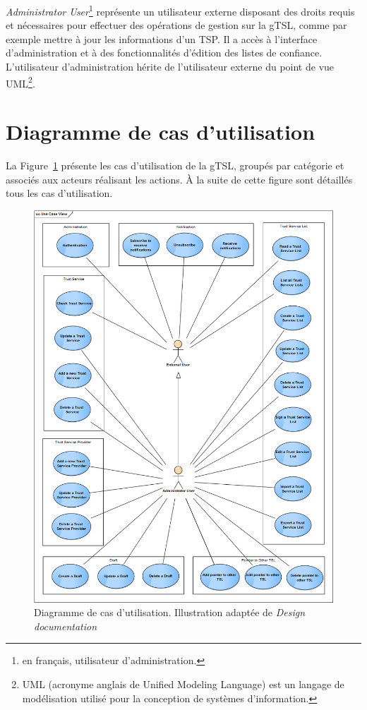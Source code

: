 \documentclass{tnreport}
\begin{document}
\textit{Administrator User}\footnote{en français, utilisateur d'administration.} représente un utilisateur externe disposant des droits requis et nécessaires pour effectuer des opérations de gestion sur la gTSL, comme par exemple mettre à jour les informations d'un TSP. Il a accès à l'interface d'administration et à des fonctionnalités d'édition des listes de confiance. L'utilisateur d'administration hérite de l'utilisateur externe du point de vue UML\footnote{UML (acronyme anglais de Unified Modeling Language) est un langage de modélisation utilisé pour la conception de systèmes d'information.}.

\section{Diagramme de cas d'utilisation}

La Figure~\ref{fig:use-case-diagram} présente les cas d'utilisation de la gTSL, groupés par catégorie et associés aux acteurs réalisant les actions. À la suite de cette figure sont détaillés tous les cas d'utilisation.

\begin{figure}[h]
	\centering
	\includegraphics[scale=0.53]{figures/use-case-diagram}
	\caption{Diagramme de cas d'utilisation. Illustration adaptée de \textit{Design documentation}~\cite{design-document}}
	\label{fig:use-case-diagram}
\end{figure}
\clearpage
\end{document}
